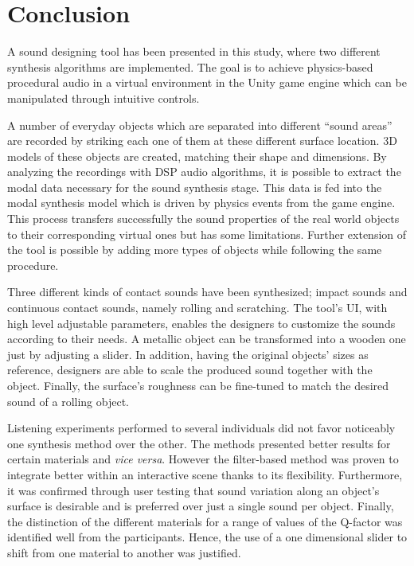 \chapter{Conclusion}

A sound designing tool has been presented in this study, where two different synthesis algorithms are implemented. The goal is to achieve physics-based procedural audio in a virtual environment in the Unity\textsuperscript{\textregistered} game engine which can be manipulated through intuitive controls. 

A number of everyday objects which are separated into different ``sound areas'' are recorded by striking each one of them at these different surface location. 3D models of these objects are created, matching their shape and dimensions. By analyzing the recordings with \gls{DSP} audio algorithms, it is possible to extract the modal data necessary for the sound synthesis stage. This data is fed into the modal synthesis model which is driven by physics events from the game engine. This process transfers successfully the sound properties of the real world objects to their corresponding virtual ones but has some limitations. Further extension of the tool is possible by adding more types of objects while following the same procedure.

Three different kinds of contact sounds have been synthesized; impact sounds and continuous contact sounds, namely rolling and scratching. The tool's \gls{UI}, with high level adjustable parameters, enables the designers to customize the sounds according to their needs. A metallic object can be transformed into a wooden one just by adjusting a slider. In addition, having the original objects' sizes as reference, designers are able to scale the produced sound together with the object. Finally, the surface's roughness can be fine-tuned to match the desired sound of a rolling object.

Listening experiments performed to several individuals did not favor noticeably one synthesis method over the other. The methods presented better results for certain materials and \textit{vice versa}. However the filter-based method was proven to integrate better within an interactive scene thanks to its flexibility. Furthermore, it was confirmed through user testing that sound variation along an object's surface is desirable and is preferred over just a single sound per object. Finally, the distinction of the different materials for a range of values of the Q-factor was identified well from the participants. Hence, the use of a one dimensional slider to shift from one material to another was justified.

